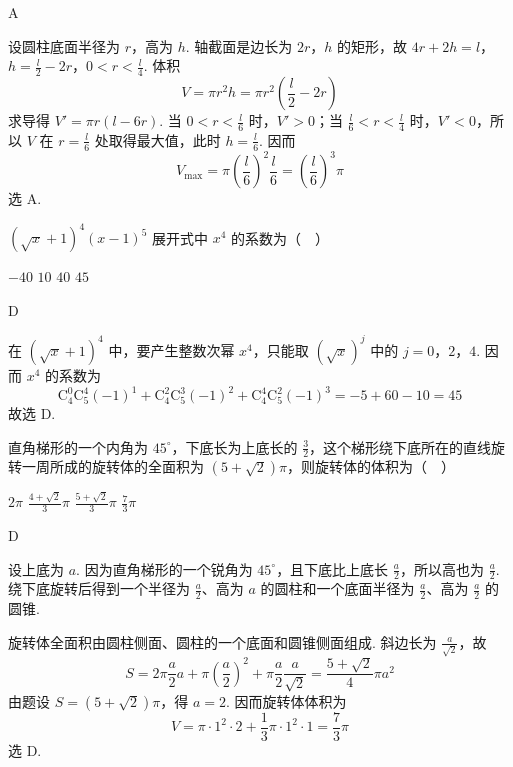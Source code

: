 \documentclass[UTF8,a4paper,oneside,11pt]{ctexbook}
\begin{document}
\begin{answer}
A
\end{answer}

\begin{solution}
设圆柱底面半径为 \(r\)，高为 \(h\). 轴截面是边长为 \(2r\)，\(h\) 的矩形，故
\(4r+2h=l\)，\(h=\frac l2-2r\)，\(0<r<\frac l4\).
体积
\[
V=\pi r^2h=\pi r^2\left(\frac l2-2r\right)
\]
求导得 \(V'=\pi r(l-6r)\). 当 \(0<r<\frac{l}{6}\) 时，\(V'>0\)；当 \(\frac{l}{6}<r<\frac{l}{4}\) 时，\(V'<0\)，所以 \(V\) 在 \(r=\frac{l}{6}\) 处取得最大值，此时 \(h=\frac{l}{6}\). 因而
\[
V_{\max}=\pi\left(\frac l6\right)^2\frac l6=\left(\frac l6\right)^3\pi
\]
选 A.
\end{solution}

\begin{problem}
\(\left(\sqrt{x}+1\right)^4\left(x-1\right)^5\) 展开式中 \(x^4\) 的系数为（\(\quad\)）

\choices
    {\(-40\)}
    {\(10\)}
    {\(40\)}
    {\(45\)}
\end{problem}

\begin{answer}
D
\end{answer}

\begin{solution}
在 \((\sqrt{x}+1)^4\) 中，要产生整数次幂 \(x^4\)，只能取 \((\sqrt{x})^j\) 中的 \(j=0\)，\(2\)，\(4\). 因而 \(x^4\) 的系数为
\[
\mathrm C_4^0\mathrm C_5^4(-1)^1
 +\mathrm C_4^2\mathrm C_5^3(-1)^2
 +\mathrm C_4^4\mathrm C_5^2(-1)^3
=-5+60-10=45
\]
故选 D.
\end{solution}

\begin{problem}
直角梯形的一个内角为 \(45^{\circ}\)，下底长为上底长的 \(\frac{3}{2}\)，这个梯形绕下底所在的直线旋转一周所成的旋转体的全面积为 \(\left(5+\sqrt{2}\right)\pi\)，则旋转体的体积为（\(\quad\)）

\choices
    {\(2\pi\)}
    {\(\frac{4+\sqrt{2}}{3}\pi\)}
    {\(\frac{5+\sqrt{2}}{3}\pi\)}
    {\(\frac{7}{3}\pi\)}
\end{problem}

\begin{answer}
D
\end{answer}

\begin{solution}
设上底为 \(a\). 因为直角梯形的一个锐角为 \(45^\circ\)，且下底比上底长 \(\frac{a}{2}\)，所以高也为 \(\frac{a}{2}\). 绕下底旋转后得到一个半径为 \(\frac{a}{2}\)、高为 \(a\) 的圆柱和一个底面半径为 \(\frac{a}{2}\)、高为 \(\frac{a}{2}\) 的圆锥.

旋转体全面积由圆柱侧面、圆柱的一个底面和圆锥侧面组成. 斜边长为 \(\frac{a}{\sqrt{2}}\)，故
\[
S=2\pi\frac a2 a+\pi\left(\frac a2\right)^2+\pi\frac a2\frac a{\sqrt2}
=\frac{5+\sqrt2}{4}\pi a^2
\]
由题设 \(S=(5+\sqrt2)\pi\)，得 \(a=2\). 因而旋转体体积为
\[
V=\pi\cdot1^2\cdot2+\frac13\pi\cdot1^2\cdot1=\frac73\pi
\]
选 D.
\end{solution}
\end{document}
